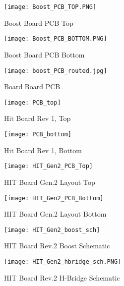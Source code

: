 \begin{figure}[ht]
\centering
\texttt{[image: Boost\_PCB\_TOP.PNG]}
\caption{Boost Board PCB Top}
\label{boostPCBTop}
\end{figure}

\begin{figure}[hb]
\centering
\texttt{[image: Boost\_PCB\_BOTTOM.PNG]}
\caption{Boost Board PCB Bottom}
\label{boostPCBBottom}
\end{figure}

\begin{figure}[ht]
\centering
\texttt{[image: boost\_PCB\_routed.jpg]}
\caption{Board Board PCB}
\label{unpopulatedBoostPCB}
\end{figure}

\begin{figure}[hb]
\centering
\texttt{[image: PCB\_top]}
\caption{Hit Board Rev 1, Top}
\label{PCB top rev1}
\end{figure}

\begin{figure}[ht]
\centering
\texttt{[image: PCB\_bottom]}
\caption{Hit Board Rev 1, Bottom}
\label{PCB bottom rev1}
\end{figure}

\begin{figure}[hb]
\centering
\texttt{[image: HIT\_Gen2\_PCB\_Top]}
\caption{HIT Board Gen.2 Layout Top}
\label{PCB top}
\end{figure}

\clearpage

\begin{figure}[ht]
\centering
\texttt{[image: HIT\_Gen2\_PCB\_Bottom]}
\caption{HIT Board Gen.2 Layout Bottom}
\label{PCB bottom}
\end{figure}

\begin{figure}[hb]
\centering
\texttt{[image: HIT\_Gen2\_boost\_sch]}
\caption{HIT Board Rev.2 Boost Schematic}
\label{Rev2 boost sch}
\end{figure}


\begin{figure}[ht]
\centering
\texttt{[image: HIT\_Gen2\_hbridge\_sch.PNG]}
\caption{HIT Board Rev.2 H-Bridge Schematic}
\label{Rev2 hbridge sch}
\end{figure}

